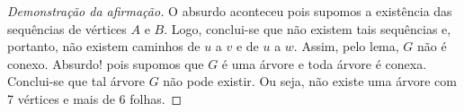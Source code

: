 \documentclass[12pt, a4paper]{article}
\theoremstyle{definition} \newtheorem{prob}{Problema}
\theoremstyle{plain} \newtheorem*{teo}{Teorema}
\begin{document}
\begin{proof}[Demonstração da afirmação]
O absurdo aconteceu pois supomos a existência das sequências de vértices \(A\) e \(B\). Logo, conclui-se que não existem tais sequências e, portanto, não existem caminhos de \(u\) a \(v\) e de \(u\) a \(w\). Assim, pelo lema, \(G\) não é conexo. Absurdo! pois supomos que \(G\) é uma árvore e toda árvore é conexa. \\

Conclui-se que tal árvore \(G\) não pode existir. Ou seja, não existe uma árvore com 7 vértices e mais de 6 folhas.

\end{proof}
 
\end{document}
